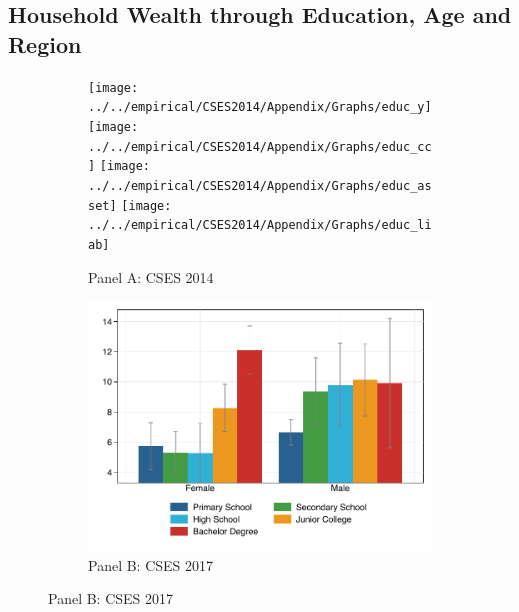 \documentclass[11pt,letterpaper]{article}
\begin{document}


\subsection{Household Wealth through Education, Age and Region}
\vspace{-1.2em}
\begin{figure}[H]
	\caption{Sex and education of the head of household}
	\label{fig:3}
	\vspace{-.8em}
	\begin{subfigure}[b]{0.33\linewidth}
		\caption*{Panel A: CSES 2014} \vspace{-.5em}
		\label{fig:3a}
		\texttt{[image: ../../empirical/CSES2014/Appendix/Graphs/educ\_y]} 
		\vspace{-2.5em}
		\newline {}
		\texttt{[image: ../../empirical/CSES2014/Appendix/Graphs/educ\_cc]} 	\vspace{-2.5em}
		\newline {}
		\texttt{[image: ../../empirical/CSES2014/Appendix/Graphs/educ\_asset]} 
		\vspace{-2.5em}
		\newline {}
		\texttt{[image: ../../empirical/CSES2014/Appendix/Graphs/educ\_liab]} 
		\vspace{-2.5em}
		\newline {}
	\end{subfigure}%
	\hfil
	\begin{subfigure}[b]{0.33\linewidth}
		\caption*{Panel B: CSES 2017} \vspace{-.5em}
		\label{fig:3b}
		\includegraphics[width=1\linewidth]{../../empirical/CSES2017/Appendix/Graphs/educ_y}

\end{subfigure}
\end{figure}
\end{document}

